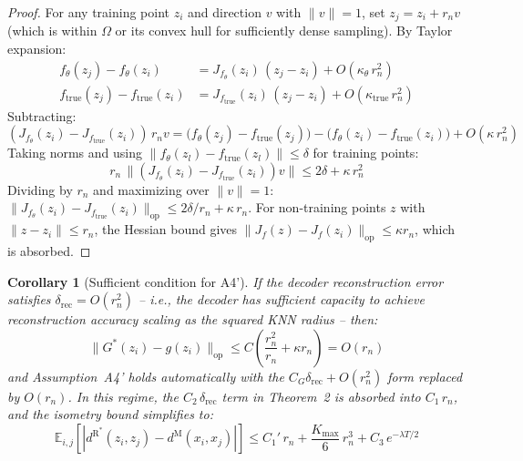 \documentclass{article}
\newtheorem{corollary}{Corollary}
\DeclareMathOperator{\op}{op}
\newcommand{\dR}{d^{\mathrm{R}}}
\newcommand{\dM}{d^{\mathrm{M}}}
\begin{document}
\begin{proof}
For any training point $z_i$ and direction $v$ with $\|v\| = 1$, set
$z_j = z_i + r_n v$ (which is within $\Omega$ or its convex hull for
sufficiently dense sampling). By Taylor expansion:
\begin{align*}
    f_\theta(z_j) - f_\theta(z_i)
    &= J_{f_\theta}(z_i)\,(z_j - z_i) + O(\kappa_\theta\,r_n^2) \\
    f_{\mathrm{true}}(z_j) - f_{\mathrm{true}}(z_i)
    &= J_{f_{\mathrm{true}}}(z_i)\,(z_j - z_i) + O(\kappa_{\mathrm{true}}\,r_n^2)
\end{align*}
Subtracting:
\[
    (J_{f_\theta}(z_i) - J_{f_{\mathrm{true}}}(z_i))\,r_n v
    = \bigl(f_\theta(z_j) - f_{\mathrm{true}}(z_j)\bigr)
    - \bigl(f_\theta(z_i) - f_{\mathrm{true}}(z_i)\bigr)
    + O(\kappa\,r_n^2)
\]
Taking norms and using $\|f_\theta(z_l) - f_{\mathrm{true}}(z_l)\| \leq \delta$
for training points:
\[
    r_n\,\|(J_{f_\theta}(z_i) - J_{f_{\mathrm{true}}}(z_i))v\|
    \leq 2\delta + \kappa\,r_n^2
\]
Dividing by $r_n$ and maximizing over $\|v\| = 1$:
$\|J_{f_\theta}(z_i) - J_{f_{\mathrm{true}}}(z_i)\|_{\op} \leq 2\delta/r_n
+ \kappa\,r_n$.
For non-training points $z$ with $\|z - z_i\| \leq r_n$, the Hessian bound
gives $\|J_f(z) - J_f(z_i)\|_{\op} \leq \kappa r_n$, which is absorbed.
\end{proof}

\begin{corollary}[Sufficient condition for A4']
\label{cor:a4}
If the decoder reconstruction error satisfies
$\delta_{\mathrm{rec}} = O(r_n^2)$ -- i.e., the decoder has sufficient
capacity to achieve reconstruction accuracy scaling as the squared KNN
radius -- then:
\begin{equation}
    \|G^*(z_i) - g(z_i)\|_{\op}
    \leq C\!\left(\frac{r_n^2}{r_n} + \kappa r_n\right)
    = O(r_n)
\end{equation}
and Assumption~A4' holds automatically with the
$C_G\delta_{\mathrm{rec}} + O(r_n^2)$ form replaced by $O(r_n)$.
In this regime, the $C_2\,\delta_{\mathrm{rec}}$ term in Theorem~2
is absorbed into $C_1\,r_n$, and the isometry bound simplifies to:
\begin{equation}
    \mathbb{E}_{i,j}\!\left[
    |\dR^*(z_i,z_j) - \dM(x_i,x_j)|\right]
    \leq C_1'\,r_n + \frac{K_{\max}}{6}\,r_n^3 + C_3\,e^{-\lambda T/2}
\end{equation}
\end{corollary}
\end{document}

